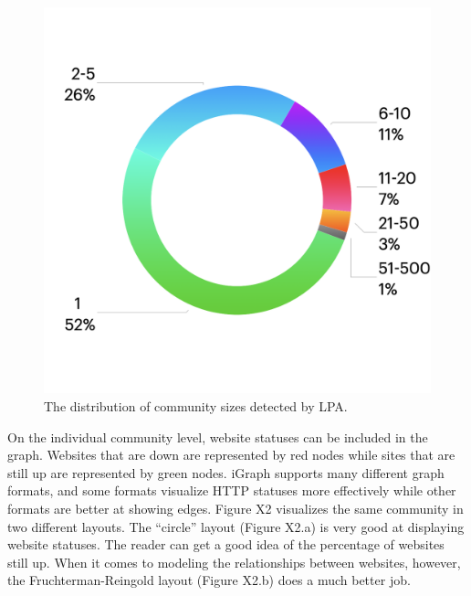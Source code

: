 \documentclass[conference]{IEEEtran}
\begin{document}
\begin{figure}[htbp]
 \centerline{\includegraphics[width=\columnwidth]{CommunitySizeDistribution.png}}
 \caption{The distribution of community sizes detected by LPA.}
\end{figure}

On the individual community level, website statuses can be included in the graph. Websites that are down are represented by red nodes while sites that are still up are represented by green nodes. iGraph supports many different graph formats, and some formats visualize HTTP statuses more effectively while other formats are better at showing edges. Figure X2 visualizes the same community in two different layouts. The “circle” layout (Figure X2.a) is very good at displaying website statuses. The reader can get a good idea of the percentage of websites still up. When it comes to modeling the relationships between websites, however, the Fruchterman-Reingold layout (Figure X2.b) does a much better job.
\end{document}
